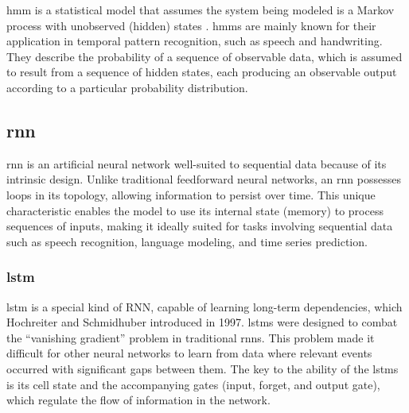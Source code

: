 \ac{hmm} is a statistical model that assumes the system being modeled is a Markov process with unobserved (hidden) states \cite{hmm-rabiner-1989}. 
\acp{hmm} are mainly known for their application in temporal pattern recognition, such as speech and handwriting.
They describe the probability of a sequence of observable data, which is assumed to result from a sequence of hidden states, each producing an observable output according to a particular probability distribution.

\subsection{\ac{rnn}}

\ac{rnn} is an artificial neural network well-suited to sequential data because of its intrinsic design.
Unlike traditional feedforward neural networks, an \ac{rnn} possesses loops in its topology, allowing information to persist over time.
This unique characteristic enables the model to use its internal state (memory) to process sequences of inputs, making it ideally suited for tasks involving sequential data such as speech recognition, language modeling, and time series prediction\cite{elman_finding_1990}.

\subsubsection{\ac{lstm}}

\ac{lstm} is a special kind of RNN, capable of learning long-term dependencies, which Hochreiter and Schmidhuber introduced in 1997\cite{lstm-hochreiter}.
\acp{lstm} were designed to combat the ``vanishing gradient'' problem in traditional \acp{rnn}. 
This problem made it difficult for other neural networks to learn from data where relevant events occurred with significant gaps between them.
The key to the ability of the \acp{lstm} is its cell state and the accompanying gates (input, forget, and output gate), which regulate the flow of information in the network.



